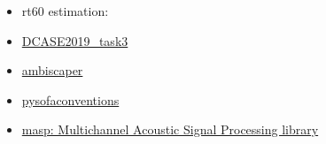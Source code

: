 \begin{itemize}

	\item rt60 estimation: 
	
	\item \href{https://github.com/andresperezlopez/DCASE2019_task3}{DCASE2019\_task3}

	\item \href{https://github.com/andresperezlopez/ambiscaper}{ambiscaper} 
	
	\item \href{https://github.com/andresperezlopez/pysofaconventions}{pysofaconventions}
	
	\item \href{https://github.com/andresperezlopez/masp}{masp: Multichannel Acoustic Signal Processing library}
	
\end{itemize}



